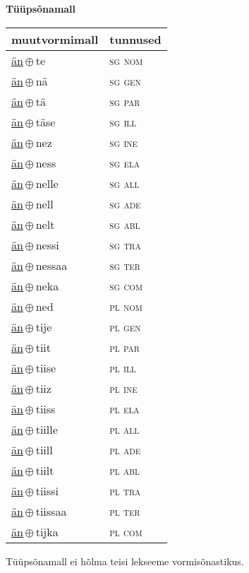 

\vspace{3.5em}
\noindent \begin{minipage}{\textwidth}
\noindent \textbf{Tüüpsõnamall \,}\\

\begin{sideways}
\begin{tabular}{l l}
muutvormimall & tunnused \\
\hline
\underline{än}\,$\oplus$\,te & \textsc{ sg nom } \\
\underline{än}\,$\oplus$\,nä & \textsc{ sg gen } \\
\underline{än}\,$\oplus$\,tä & \textsc{ sg par } \\
\underline{än}\,$\oplus$\,täse & \textsc{ sg ill } \\
\underline{än}\,$\oplus$\,nez & \textsc{ sg ine } \\
\underline{än}\,$\oplus$\,ness & \textsc{ sg ela } \\
\underline{än}\,$\oplus$\,nelle & \textsc{ sg all } \\
\underline{än}\,$\oplus$\,nell & \textsc{ sg ade } \\
\underline{än}\,$\oplus$\,nelt & \textsc{ sg abl } \\
\underline{än}\,$\oplus$\,nessi & \textsc{ sg tra } \\
\underline{än}\,$\oplus$\,nessaa & \textsc{ sg ter } \\
\underline{än}\,$\oplus$\,neka & \textsc{ sg com } \\
\underline{än}\,$\oplus$\,ned & \textsc{ pl nom } \\
\underline{än}\,$\oplus$\,tije & \textsc{ pl gen } \\
\underline{än}\,$\oplus$\,tiit & \textsc{ pl par } \\
\underline{än}\,$\oplus$\,tiise & \textsc{ pl ill } \\
\underline{än}\,$\oplus$\,tiiz & \textsc{ pl ine } \\
\underline{än}\,$\oplus$\,tiiss & \textsc{ pl ela } \\
\underline{än}\,$\oplus$\,tiille & \textsc{ pl all } \\
\underline{än}\,$\oplus$\,tiill & \textsc{ pl ade } \\
\underline{än}\,$\oplus$\,tiilt & \textsc{ pl abl } \\
\underline{än}\,$\oplus$\,tiissi & \textsc{ pl tra } \\
\underline{än}\,$\oplus$\,tiissaa & \textsc{ pl ter } \\
\underline{än}\,$\oplus$\,tijka & \textsc{ pl com } \\
\end{tabular}
\end{sideways}
\label{tab:tüüpsõnamall-änte}

\end{minipage}

 
\vspace{1em}
\noindent Tüüpsõnamall  ei hõlma teisi lekseeme vormi\-sõnastikus.
